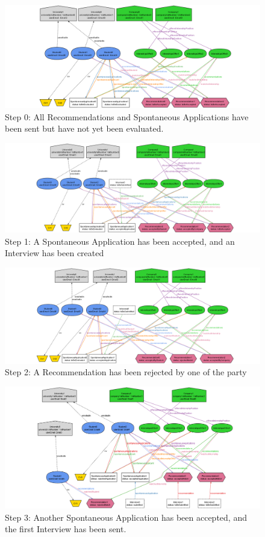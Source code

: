 \begin{figure}[H]
    \hspace{-2.5cm}
    \includegraphics[width=1.3\linewidth]{Alloy/AlloyImage/0.png}
    \caption{Step 0: All Recommendations and Spontaneous Applications have been sent but have not yet been evaluated.}
    \label{fig:ALIMG0}
\end{figure}
\begin{figure}[H]
    \hspace{-2.5cm}
    \includegraphics[width=1.3\linewidth]{Alloy/AlloyImage/1.png}
    \caption{Step 1: A Spontaneous Application has been accepted, and an Interview has been created}
    \label{fig:ALIMG1}
\end{figure}
\begin{figure}[H]
    \hspace{-2.5cm}
    \includegraphics[width=1.3\linewidth]{Alloy/AlloyImage/2.png}
    \caption{Step 2: A Recommendation has been rejected by one of the party}
    \label{fig:ALIMG2}
\end{figure}
\begin{figure}[H]
    \hspace{-2.5cm}
    \includegraphics[width=1.3\linewidth]{Alloy/AlloyImage/3.png}
    \caption{Step 3: Another Spontaneous Application has been accepted, and the first Interview has been sent. }
    \label{fig:ALIMG3}
\end{figure}


